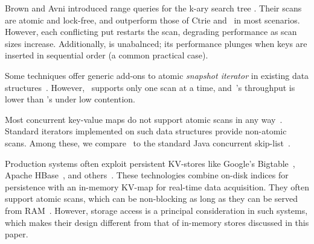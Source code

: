 
Brown and Avni \cite{BrownA12} introduced range queries for the k-ary search tree \cite{kary}.
Their scans are atomic and lock-free, and outperform those  of Ctrie and \snaptree\ in most scenarios.
However, each conflicting put restarts the scan,
degrading performance as scan sizes increase. Additionally,
\kary is unabalnced; its performance plunges when keys are inserted in sequential order
(a common practical case).

Some techniques offer generic add-ons to atomic \emph{snapshot iterator} in existing data structures~\cite{Petrank2013, wttm2016}.
However,~\cite{Petrank2013} supports only one scan at a time, and~\cite{wttm2016}'s throughput is lower than \kary's under low contention. 

Most concurrent key-value maps do not support atomic  scans in any
way~\cite{JavaConcurrentSkipList,LinkedListBP,BraginskyP2012,Hendler04,NatarajanM2014,Kogan12,Lomet13}.
Standard iterators implemented on such data structures provide non-atomic scans. Among these, we compare \kiwi\ to the standard Java 
concurrent skip-list~\cite{Fraser04}.

Production systems often exploit persistent KV-stores like Google's Bigtable~\cite{Chang2008}, Apache HBase~\cite{ApacheHBase}, 
and others~\cite{leveldb, RocksDB}. These technologies combine on-disk indices for persistence with an in-memory KV-map 
for real-time data acquisition. They often support atomic scans, which can be non-blocking as long as they can be served from 
RAM~\cite{GolanGueta2015}. However, storage access is a principal consideration in such systems, which makes their design 
different from that of in-memory stores discussed in this paper.

